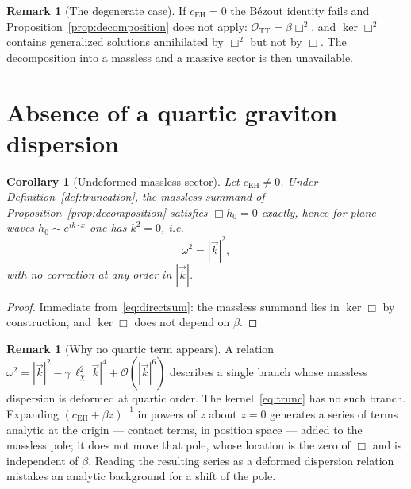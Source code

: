 \documentclass[12pt,a4paper]{article}
\newtheorem{corollary}[theorem]{Corollary}
\theoremstyle{definition}
\newtheorem{remark}[theorem]{Remark}
\newcommand{\cEH}{c_{\mathrm{EH}}}
\newcommand{\OTT}{\mathcal{O}_{\mathrm{TT}}}
\begin{document}
    \begin{remark}[The degenerate case]
      \label{rem:degenerate}
      If $\cEH = 0$ the B\'ezout identity fails and Proposition~\ref{prop:decomposition} does not apply:
      $\OTT = \beta\Box^2$, and $\ker\Box^2$ contains generalized solutions annihilated by $\Box^2$ but not by
      $\Box$. The decomposition into a massless and a massive sector is then unavailable.
    \end{remark}

  \section{Absence of a quartic graviton dispersion}
    \label{sec:no-k4}

    \begin{corollary}[Undeformed massless sector]
      \label{cor:no-k4}
      Let $\cEH \neq 0$. Under Definition~\ref{def:truncation}, the massless summand of
      Proposition~\ref{prop:decomposition} satisfies $\Box h_0 = 0$ exactly, hence for plane waves
      $h_0 \sim e^{ik\cdot x}$ one has $k^2 = 0$, i.e.
      \begin{equation}
        \omega^2 = |\vec k|^2 ,
        \label{eq:massless}
      \end{equation}
      with no correction at any order in $|\vec k|$.
    \end{corollary}

    \begin{proof}
      Immediate from~\eqref{eq:directsum}: the massless summand lies in $\ker\Box$ by construction, and $\ker\Box$
      does not depend on $\beta$.
    \end{proof}

    \begin{remark}[Why no quartic term appears]
      \label{rem:why}
      A relation $\omega^2 = |\vec k|^2 - \gamma\,\ell_\chi^2|\vec k|^4 + \mathcal{O}(|\vec k|^6)$ describes a
      single branch whose massless dispersion is deformed at quartic order. The kernel~\eqref{eq:trunc} has no
      such branch. Expanding $(\cEH + \beta z)^{-1}$ in powers of $z$ about $z = 0$ generates a series of terms
      analytic at the origin --- contact terms, in position space --- added to the massless pole; it does not
      move that pole, whose location is the zero of $\Box$ and is independent of $\beta$. Reading the resulting
      series as a deformed dispersion relation mistakes an analytic background for a shift of the pole.
    \end{remark}
\end{document}
